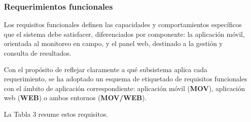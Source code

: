 
\subsubsection{Requerimientos funcionales}\label{subsec:rf}
Los requisitos funcionales definen las capacidades y comportamientos específicos que el sistema debe satisfacer, diferenciados por componente: la aplicación móvil, orientada al monitoreo en campo, y el panel web, destinado a la gestión y consulta de resultados. 

Con el propósito de reflejar claramente a qué subsistema aplica cada requerimiento, se ha adoptado un esquema de etiquetado de requisitos funcionales con el ámbito de aplicación correspondiente: aplicación móvil (\textbf{MOV}), aplicación web (\textbf{WEB}) o ambos entornos (\textbf{MOV/WEB}).

La Tabla 3 resume estos requisitos.

